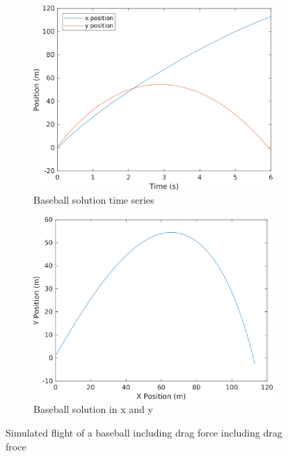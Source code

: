 \begin{figure}[h]
    \centering
    \begin{subfigure}{0.45\textwidth}
        \centering
        \includegraphics[width=\linewidth]{../code/chap_twodimensions/baseball2_time.png}
        \caption{Baseball solution time series}
    \end{subfigure}
    \quad %
    \begin{subfigure}{0.45\textwidth}
        \centering
        \includegraphics[width=\linewidth]{../code/chap_twodimensions/baseball2_xy.png}
        \caption{Baseball solution in x and y}
    \end{subfigure}
    \caption{Simulated flight of a baseball including drag force including drag froce}
    \label{f:baseball2}
\end{figure}

